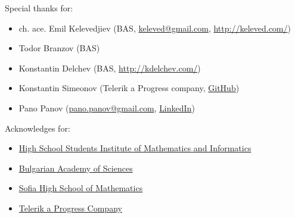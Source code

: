 \documentclass[12pt]{beamer}
\begin{document}
	\begin{frame}
		Special thanks for:
		\begin{itemize}
			\item ch. ace. Emil Kelevedjiev (BAS, \href{mailto:keleved@gmail.com}{keleved@gmail.com}, \href{http://keleved.com/}{http://keleved.com/})
			\item Todor Branzov (BAS)
			\item Konstantin Delchev (BAS, \href{http://kdelchev.com/}{http://kdelchev.com/})
			\item Konstantin Simeonov (Telerik a Progress company, \href{https://github.com/KonstantinSimeonov}{GitHub})
			\item Pano Panov (\href{mailto:pano.panov@gmail.com}{pano.panov@gmail.com}, \href{https://bg.linkedin.com/in/pano-panov-40357a75?trk=prof-samename-name}{LinkedIn})
		\end{itemize}
		\vspace{0.5cm}
		Acknowledges for:
		\begin{itemize}
			\item \href{http://www.math.bas.bg/omi/hssimi/}{High School Students Institute of Mathematics and Informatics}
			\item \href{http://www.math.bas.bg/}{Bulgarian Academy of Sciences}
			\item \href{http://www.smg.bg}{Sofia High School of Mathematics}
			\item \href{http://www.telerik.com}{Telerik a Progress Company}
		\end{itemize}
	\end{frame}
	
\end{document}
